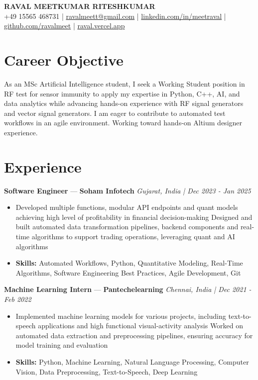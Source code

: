 \documentclass[a4paper,10pt]{article}
\begin{document}
\begin{center}
  {\Large\bfseries RAVAL MEETKUMAR RITESHKUMAR}\\[2pt]
  {\small +49 15565 468731 \;|\; \href{mailto:ravalmeett@gmail.com}{ravalmeett@gmail.com} \;|\; \href{https://www.linkedin.com/in/meetraval/}{linkedin.com/in/meetraval} \;|\; \href{https://github.com/ravalmeet}{github.com/ravalmeet} \;|\; \href{https://raval.vercel.app/}{raval.vercel.app}}
\end{center}
\vspace{-3pt}

\section*{Career Objective}
As an MSc Artificial Intelligence student, I seek a Working Student position in RF test for sensor immunity to apply my expertise in Python, C++, AI, and data analytics while advancing hands-on experience with RF signal generators and vector signal generators. I am eager to contribute to automated test workflows in an agile environment. Working toward hands-on Altium designer experience.\par

\section*{Experience}
\textbf{Software Engineer} — \textbf{Soham Infotech} \hfill \textit{Gujarat, India \;|\; Dec 2023 - Jan 2025}\par
\vspace{1pt}
\begin{itemize}
  \item Developed multiple functions, modular API endpoints and quant models achieving high level of profitability in financial decision-making Designed and built automated data transformation pipelines, backend components and real-time algorithms to support trading operations, leveraging quant and AI algorithms
  \item \textbf{Skills:} Automated Workflows, Python, Quantitative Modeling, Real-Time Algorithms, Software Engineering Best Practices, Agile Development, Git
\end{itemize}
\vspace{3pt}
\textbf{Machine Learning Intern} — \textbf{Pantechelearning} \hfill \textit{Chennai, India \;|\; Dec 2021 - Feb 2022}\par
\vspace{1pt}
\begin{itemize}
  \item Implemented machine learning models for various projects, including text-to-speech applications and high functional visual-activity analysis Worked on automated data extraction and preprocessing pipelines, ensuring accuracy for model training and evaluation
  \item \textbf{Skills:} Python, Machine Learning, Natural Language Processing, Computer Vision, Data Preprocessing, Text-to-Speech, Deep Learning
\end{itemize}
\end{document}

